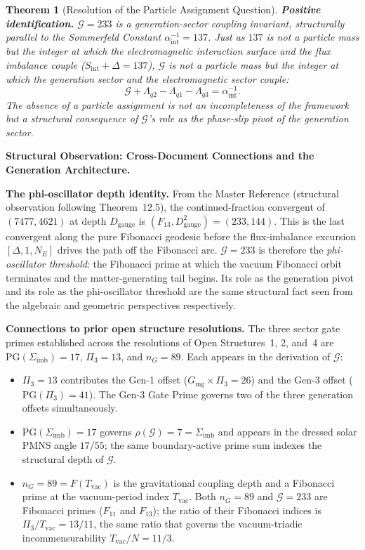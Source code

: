 \documentclass[11pt, letterpaper]{article}
\theoremstyle{definition}
\theoremstyle{plain}
\newtheorem{theorem}{Theorem}[section]
\begin{document}
\begin{theorem}[Resolution of the Particle Assignment Question]
\medskip
\noindent\textbf{Positive identification.}
$\mathcal{G} = 233$ is a generation-sector coupling invariant, structurally
parallel to the Sommerfeld Constant $\alpha^{-1}_\mathrm{int} = 137$. Just as
$137$ is not a particle mass but the integer at which the electromagnetic interaction
surface and the flux imbalance couple ($S_\mathrm{int} + \Delta = 137$), $\mathcal{G}$
is not a particle mass but the integer at which the generation sector and the
electromagnetic sector couple:
\[
    \mathcal{G} + \Lambda_{q2} - \Lambda_{q1} - \Lambda_{q3} = \alpha^{-1}_\mathrm{int}.
\]
The absence of a particle assignment is not an incompleteness of the framework but a
structural consequence of $\mathcal{G}$'s role as the phase-slip pivot of the
generation sector.
\end{theorem}

\begin{observebox}
\textbf{Structural Observation: Cross-Document Connections and the Generation Architecture.}

\noindent\textbf{The phi-oscillator depth identity.}
From the Master Reference (structural observation following Theorem~12.5), the
continued-fraction convergent of $(7477, 4621)$ at depth $D_\mathrm{gauge}$ is
$(F_{13}, D_\mathrm{gauge}^2) = (233, 144)$. This is the last convergent along the
pure Fibonacci geodesic before the flux-imbalance excursion $[\Delta, 1, N_E]$ drives
the path off the Fibonacci arc. $\mathcal{G} = 233$ is therefore the
\emph{phi-oscillator threshold}: the Fibonacci prime at which the vacuum Fibonacci
orbit terminates and the matter-generating tail begins. Its role as the generation
pivot and its role as the phi-oscillator threshold are the same structural fact seen
from the algebraic and geometric perspectives respectively.

\noindent\textbf{Connections to prior open structure resolutions.}
The three sector gate primes established across the resolutions of Open Structures~1,
2, and~4 are $\mathrm{PG}(\Sigma_\mathrm{imb}) = 17$, $\Pi_3 = 13$, and $n_G = 89$.
Each appears in the derivation of $\mathcal{G}$:
\begin{itemize}
  \item $\Pi_3 = 13$ contributes the Gen-1 offset ($G_\mathrm{mg} \times \Pi_3 = 26$) and
    the Gen-3 offset ($\mathrm{PG}(\Pi_3) = 41$). The Gen-3 Gate Prime governs two of
    the three generation offsets simultaneously.
  \item $\mathrm{PG}(\Sigma_\mathrm{imb}) = 17$ governs $\rho(\mathcal{G}) = 7 =
    \Sigma_\mathrm{imb}$ and appears in the dressed solar PMNS angle $17/55$; the
    same boundary-active prime sum indexes the structural depth of $\mathcal{G}$.
  \item $n_G = 89 = F(T_\mathrm{vac})$ is the gravitational coupling depth and a
    Fibonacci prime at the vacuum-period index $T_\mathrm{vac}$. Both $n_G = 89$ and
    $\mathcal{G} = 233$ are Fibonacci primes ($F_{11}$ and $F_{13}$); the ratio of
    their Fibonacci indices is $\Pi_3/T_\mathrm{vac} = 13/11$, the same ratio that
    governs the vacuum-triadic incommensurability $T_\mathrm{vac}/N = 11/3$.
\end{itemize}


\end{observebox}
\end{document}
